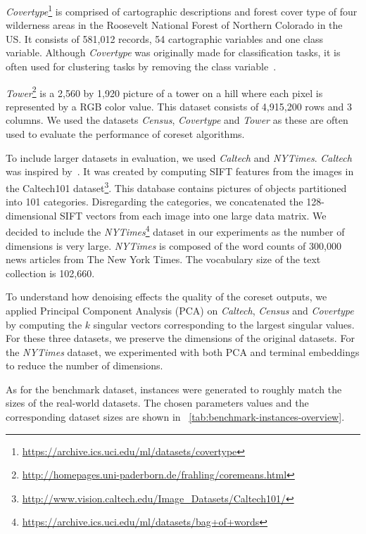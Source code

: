 \textit{Covertype}\footnote{\url{https://archive.ics.uci.edu/ml/datasets/covertype}} is comprised of cartographic descriptions and forest cover type of four wilderness areas in the Roosevelt National Forest of Northern Colorado in the US. It consists of 581,012 records, 54 cartographic variables and one class variable. Although \textit{Covertype} was originally made for classification tasks, it is often used for clustering tasks by removing the class variable~\cite{AckermannMRSLS12}.

\textit{Tower}\footnote{\url{http://homepages.uni-paderborn.de/frahling/coremeans.html}} is a 2,560 by 1,920 picture of a tower on a hill where each pixel is represented by a RGB color value. This dataset consists of 4,915,200 rows and 3 columns. 
We used the datasets \textit{Census}, \textit{Covertype} and \textit{Tower} as these are often used to evaluate the performance of coreset algorithms. 

To include larger datasets in evaluation, we used \textit{Caltech} and \textit{NYTimes}. \textit{Caltech} was inspired by~\cite{FGSSS13}. It was created by computing SIFT features from the images in the Caltech101 dataset\footnote{\url{http://www.vision.caltech.edu/Image_Datasets/Caltech101/}}. This database contains pictures of objects partitioned into 101 categories. Disregarding the categories, we concatenated the 128-dimensional SIFT vectors from each image into one large data matrix. 
We decided to include the \textit{NYTimes}\footnote{\url{https://archive.ics.uci.edu/ml/datasets/bag+of+words}} dataset in our experiments as the number of dimensions is very large. \textit{NYTimes} is composed of the word counts of 300,000 news articles from The New York Times. The vocabulary size of the text collection is 102,660.

To understand how denoising effects the quality of the coreset outputs, we applied Principal Component Analysis (PCA) on \textit{Caltech}, \textit{Census} and \textit{Covertype} by computing the $k$ singular vectors corresponding to the largest singular values. For these three datasets, we preserve the dimensions of the original datasets. For the \textit{NYTimes} dataset, we experimented with both PCA and terminal embeddings to reduce the number of dimensions.

As for the benchmark dataset, instances were generated to roughly match the sizes of the real-world datasets. The chosen parameters values and the corresponding dataset sizes are shown in ~\cref{tab:benchmark-instances-overview}. 




